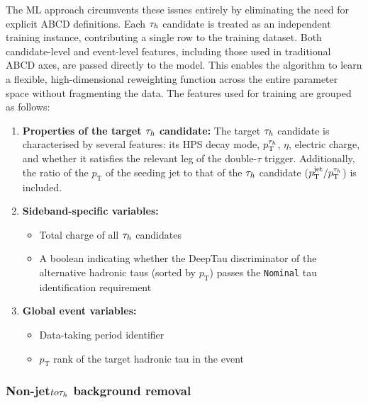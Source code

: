 The ML approach circumvents these issues entirely by eliminating the need for explicit ABCD definitions. Each $\tau_h$ candidate is treated as an independent training instance, contributing a single row to the training dataset. Both candidate-level and event-level features, including those used in traditional ABCD axes, are passed directly to the model. This enables the algorithm to learn a flexible, high-dimensional reweighting function across the entire parameter space without fragmenting the data. The features used for training are grouped as follows:

\begin{enumerate}[label=(\roman*)]

    \item \textbf{Properties of the target $\tau_h$ candidate:} The target $\tau_h$ candidate is characterised by several features: its HPS decay mode, $p_\text{T}^{\tau_h}$,  $\eta$, electric charge, and whether it satisfies the relevant leg of the double-$\tau$ trigger. Additionally, the ratio of the $p_\text{T}$ of the seeding jet to that of the $\tau_h$ candidate ($p_\text{T}^\text{jet} / p_\text{T}^{\tau_h}$) is included.

    \item \textbf{Sideband-specific variables:}
    \begin{itemize}
        \item Total charge of all $\tau_h$ candidates
        \item A boolean indicating whether the DeepTau discriminator of the alternative hadronic taus (sorted by $p_\text{T}$) passes the \texttt{Nominal} tau identification requirement
    \end{itemize}

    \item \textbf{Global event variables:}
    \begin{itemize}
        \item Data-taking period identifier
        \item $p_\text{T}$ rank of the target hadronic tau in the event
    \end{itemize}

\end{enumerate}

\subsubsection{\texorpdfstring{Non-jet$to \tau_h$ background removal}{Non-jet to hadronic tau background removal}}
\label{Section:Chapter6_BDT_NonJet_BkgRemoval}

